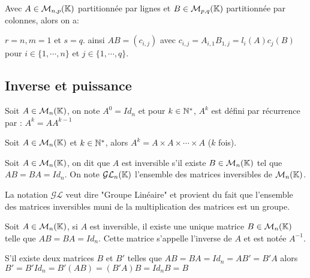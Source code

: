 \documentclass[a4paper, 12pt]{article}
\begin{document}
\begin{remarque}
    Avec $A \in \mathcal{M}_{n,p}(\mathbb{K})$ partitionnée par lignes et $B \in \mathcal{M}_{p,q}(\mathbb{K})$ partitionnée par colonnes, alors on a:

    $r = n, m = 1$ et $s = q$.
    ainsi $AB = (c_{i,j})$ avec $c_{i,j} = A_{i,1}B_{1,j} = l_i(A)c_j(B)$ pour $i \in \{1, \cdots, n\}$ et $j \in \{1, \cdots, q\}$.
\end{remarque}

\subsection{Inverse et puissance}

\begin{definition}
    Soit $A \in \mathcal{M}_n(\mathbb{K})$, on note $A^0 = Id_n$ et pour $k \in \mathbb{N}^*$, $A^k$ est défini par récurrence par : $A^k = AA^{k-1}$
\end{definition}

\begin{propriete}{}{}
    Soit $A \in \mathcal{M}_n(\mathbb{K})$ et $k \in \mathbb{N}^*$, alors $A^k = A \times A \times \cdots \times A$ ($k$ fois).
\end{propriete}

\begin{definition}
    Soit $A \in \mathcal{M}_n(\mathbb{K})$, on dit que $A$ est inversible s'il existe $B \in \mathcal{M}_n(\mathbb{K})$ tel que $AB = BA = Id_n$.
    On note $\mathcal{GL}_n(\mathbb{K})$ l'ensemble des matrices inversibles de $\mathcal{M}_n(\mathbb{K})$.
\end{definition}

\begin{remarque}
    La notation $\mathcal{GL}$ veut dire "Groupe Linéaire" et provient du fait que l'ensemble des matrices inversibles muni de la multiplication des matrices est un groupe.
\end{remarque}

\begin{proposition}{}{}
    Soit $A \in \mathcal{M}_n(\mathbb{K})$, si $A$ est inversible, il existe une unique matrice $B \in \mathcal{M}_n(\mathbb{K})$ telle que $AB = BA = Id_n$.
    Cette matrice s'appelle l'inverse de $A$ et est notée $A^{-1}$.
\end{proposition}

\begin{demonstration}
    S'il existe deux matrices $B$ et $B'$ telles que $AB = BA = Id_n = AB' = B'A$ alors $B' = B'Id_n = B'(AB) = (B'A)B = Id_nB = B$
\end{demonstration}
\end{document}
